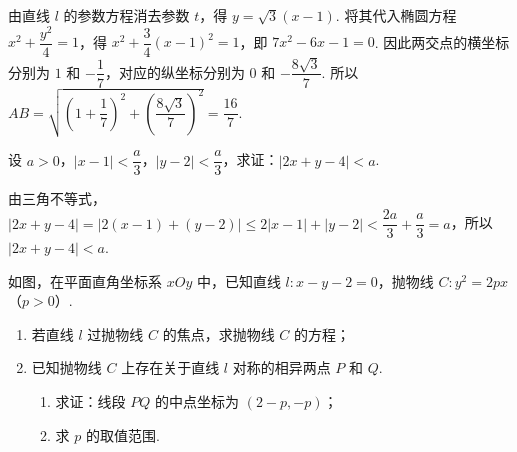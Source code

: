 \begin{solution}
由直线 \(l\) 的参数方程消去参数 \(t\)，得 \(y=\sqrt3(x-1)\). 将其代入椭圆方程 \(x^2+\dfrac{y^2}{4}=1\)，得 \(x^2+\dfrac34(x-1)^2=1\)，即 \(7x^2-6x-1=0\). 因此两交点的横坐标分别为 \(1\) 和 \(-\dfrac17\)，对应的纵坐标分别为 \(0\) 和 \(-\dfrac{8\sqrt3}{7}\). 所以 \(AB=\sqrt{\left(1+\dfrac17\right)^2+\left(\dfrac{8\sqrt3}{7}\right)^2}=\dfrac{16}{7}\).
\end{solution}

\reuseproblemnumber
\begin{problem}[D]
设 \(a>0\)，\(|x-1|<\dfrac a3\)，\(|y-2|<\dfrac a3\)，求证：\(|2x+y-4|<a\).
\end{problem}



\begin{solution}
由三角不等式，\(|2x+y-4|=|2(x-1)+(y-2)|\le2|x-1|+|y-2|<\dfrac{2a}{3}+\dfrac a3=a\)，所以 \(|2x+y-4|<a\).
\end{solution}

\begin{problem}
如图，在平面直角坐标系 \(xOy\) 中，已知直线 \(l:x-y-2=0\)，抛物线 \(C:y^2=2px\)（\(p>0\)）.

\begin{enumerate}
\item 若直线 \(l\) 过抛物线 \(C\) 的焦点，求抛物线 \(C\) 的方程；
\item 已知抛物线 \(C\) 上存在关于直线 \(l\) 对称的相异两点 \(P\) 和 \(Q\).

\begin{enumerate}
\item 求证：线段 \(PQ\) 的中点坐标为 \((2-p,-p)\)；
\item 求 \(p\) 的取值范围.
\end{enumerate}
\end{enumerate}

\end{problem}

